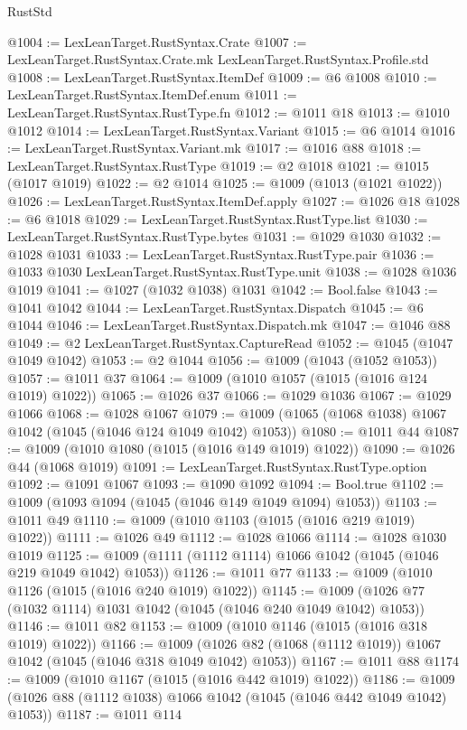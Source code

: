 \begin{lexlean}{RustStd}
\begin{coremodule}
@1004 := LexLeanTarget.RustSyntax.Crate
@1007 := LexLeanTarget.RustSyntax.Crate.mk LexLeanTarget.RustSyntax.Profile.std
@1008 := LexLeanTarget.RustSyntax.ItemDef
@1009 := @6 @1008
@1010 := LexLeanTarget.RustSyntax.ItemDef.enum
@1011 := LexLeanTarget.RustSyntax.RustType.fn
@1012 := @1011 @18
@1013 := @1010 @1012
@1014 := LexLeanTarget.RustSyntax.Variant
@1015 := @6 @1014
@1016 := LexLeanTarget.RustSyntax.Variant.mk
@1017 := @1016 @88
@1018 := LexLeanTarget.RustSyntax.RustType
@1019 := @2 @1018
@1021 := @1015 (@1017 @1019)
@1022 := @2 @1014
@1025 := @1009 (@1013 (@1021 @1022))
@1026 := LexLeanTarget.RustSyntax.ItemDef.apply
@1027 := @1026 @18
@1028 := @6 @1018
@1029 := LexLeanTarget.RustSyntax.RustType.list
@1030 := LexLeanTarget.RustSyntax.RustType.bytes
@1031 := @1029 @1030
@1032 := @1028 @1031
@1033 := LexLeanTarget.RustSyntax.RustType.pair
@1036 := @1033 @1030 LexLeanTarget.RustSyntax.RustType.unit
@1038 := @1028 @1036 @1019
@1041 := @1027 (@1032 @1038) @1031
@1042 := Bool.false
@1043 := @1041 @1042
@1044 := LexLeanTarget.RustSyntax.Dispatch
@1045 := @6 @1044
@1046 := LexLeanTarget.RustSyntax.Dispatch.mk
@1047 := @1046 @88
@1049 := @2 LexLeanTarget.RustSyntax.CaptureRead
@1052 := @1045 (@1047 @1049 @1042)
@1053 := @2 @1044
@1056 := @1009 (@1043 (@1052 @1053))
@1057 := @1011 @37
@1064 := @1009 (@1010 @1057 (@1015 (@1016 @124 @1019) @1022))
@1065 := @1026 @37
@1066 := @1029 @1036
@1067 := @1029 @1066
@1068 := @1028 @1067
@1079 := @1009 (@1065 (@1068 @1038) @1067 @1042 (@1045 (@1046 @124 @1049 @1042) @1053))
@1080 := @1011 @44
@1087 := @1009 (@1010 @1080 (@1015 (@1016 @149 @1019) @1022))
@1090 := @1026 @44 (@1068 @1019)
@1091 := LexLeanTarget.RustSyntax.RustType.option
@1092 := @1091 @1067
@1093 := @1090 @1092
@1094 := Bool.true
@1102 := @1009 (@1093 @1094 (@1045 (@1046 @149 @1049 @1094) @1053))
@1103 := @1011 @49
@1110 := @1009 (@1010 @1103 (@1015 (@1016 @219 @1019) @1022))
@1111 := @1026 @49
@1112 := @1028 @1066
@1114 := @1028 @1030 @1019
@1125 := @1009 (@1111 (@1112 @1114) @1066 @1042 (@1045 (@1046 @219 @1049 @1042) @1053))
@1126 := @1011 @77
@1133 := @1009 (@1010 @1126 (@1015 (@1016 @240 @1019) @1022))
@1145 := @1009 (@1026 @77 (@1032 @1114) @1031 @1042 (@1045 (@1046 @240 @1049 @1042) @1053))
@1146 := @1011 @82
@1153 := @1009 (@1010 @1146 (@1015 (@1016 @318 @1019) @1022))
@1166 := @1009 (@1026 @82 (@1068 (@1112 @1019)) @1067 @1042 (@1045 (@1046 @318 @1049 @1042) @1053))
@1167 := @1011 @88
@1174 := @1009 (@1010 @1167 (@1015 (@1016 @442 @1019) @1022))
@1186 := @1009 (@1026 @88 (@1112 @1038) @1066 @1042 (@1045 (@1046 @442 @1049 @1042) @1053))
@1187 := @1011 @114

\end{coremodule}
\end{lexlean}
